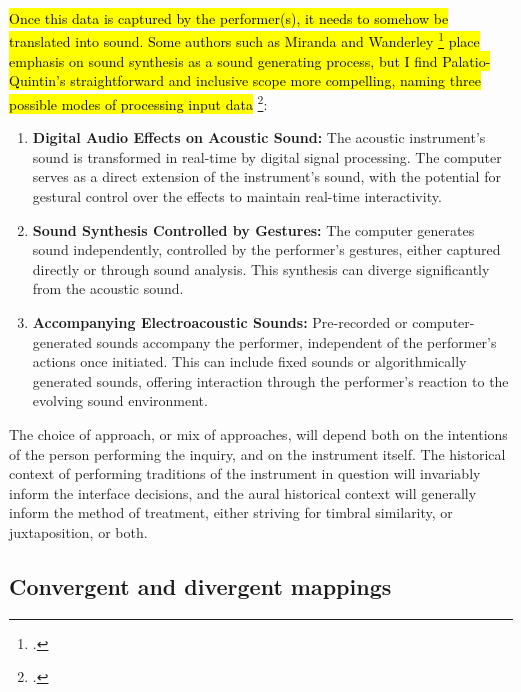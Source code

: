 \documentclass[12pt,twoside,maitrise]{dms_ks}
\theoremstyle{definition}
\begin{document}

\hl{Once this data is captured by the performer(s), it needs to somehow be translated into sound. Some authors such as Miranda and Wanderley \footcite[3]{miranda_new_2006} place emphasis on sound synthesis as a sound generating process, but I find Palatio-Quintin's straightforward and inclusive scope more compelling, naming three possible modes of processing input data} \footcite[52]{palacio-quintin_composition_2012-1}:

{\begin{enumerate}
  \item \textbf{Digital Audio Effects on Acoustic Sound:} The acoustic instrument's sound is transformed in real-time by digital signal processing. 
The computer serves as a direct extension of the instrument's sound, with the potential for gestural control over the effects to maintain real-time interactivity.
  
  \item \textbf{Sound Synthesis Controlled by Gestures:} The computer generates sound independently, controlled by the performer's gestures, either captured directly or through sound analysis. 
This synthesis can diverge significantly from the acoustic sound.
  
  \item \textbf{Accompanying Electroacoustic Sounds:} Pre-recorded or computer-generated sounds accompany the performer, independent of the performer's actions once initiated. 
This can include fixed sounds or algorithmically generated sounds, offering interaction through the performer's reaction to the evolving sound environment.
\end{enumerate}



The choice of approach, or mix of approaches, will depend both on the intentions of the person performing the inquiry, and on the instrument itself. The historical context of performing traditions of the instrument in question will invariably inform the interface decisions, and the aural historical context will generally inform the method of treatment, either striving for timbral similarity, or juxtaposition, or both.

\subsection{Convergent and divergent mappings}

}
\end{document}
